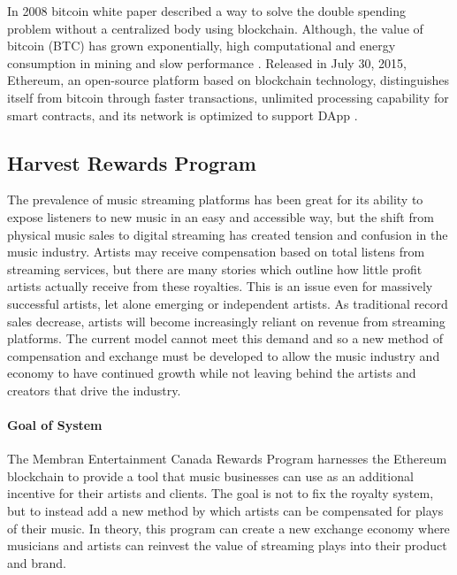 \documentclass[12pt,tightenlines,letterpaper]{scrartcl}
\begin{document}
\begin{minipage}[h]{0.55\linewidth}
In 2008 bitcoin white paper \cite{bitcoinWhitePaper:Online} described a way to solve the double spending problem without a centralized body using \gls{blockchain}. Although, the value of bitcoin (BTC) has grown exponentially, high computational and energy consumption in mining and slow performance \cite{bitCoinProblems:Online}.  Released in July 30, 2015, Ethereum, an open-source platform based on blockchain technology, distinguishes itself from bitcoin through faster transactions, unlimited processing capability for \glspl{smart contract}, and its network is optimized to support \gls{DApp} \cite{ethereumWhitePaper:Online}.
\end{minipage}%

\subsection{Harvest Rewards Program}

The prevalence of music streaming platforms has been great for its ability to expose listeners to new music in an easy and accessible way, but the shift from physical music sales to digital streaming has created tension and confusion in the music industry. Artists may receive compensation based on total listens from streaming services, but there are many stories which outline how little profit artists actually receive from these royalties. This is an issue even for massively successful artists, let alone emerging or independent artists. As traditional record sales decrease, artists will become increasingly reliant on revenue from streaming platforms. The current model cannot meet this demand and so a new method of compensation and exchange must be developed to allow the music industry and economy to have continued growth while not leaving behind the artists and creators that drive the industry.

\paragraph{Goal of System} 

The Membran Entertainment Canada Rewards Program harnesses the Ethereum blockchain to provide a tool that music businesses can use as an additional incentive for their artists and clients. The goal is not to fix the royalty system, but to instead add a new method by which artists can be compensated for plays of their music. In theory, this program can create a new exchange economy where musicians and artists can reinvest the value of streaming plays into their product and brand. 
\end{document}
